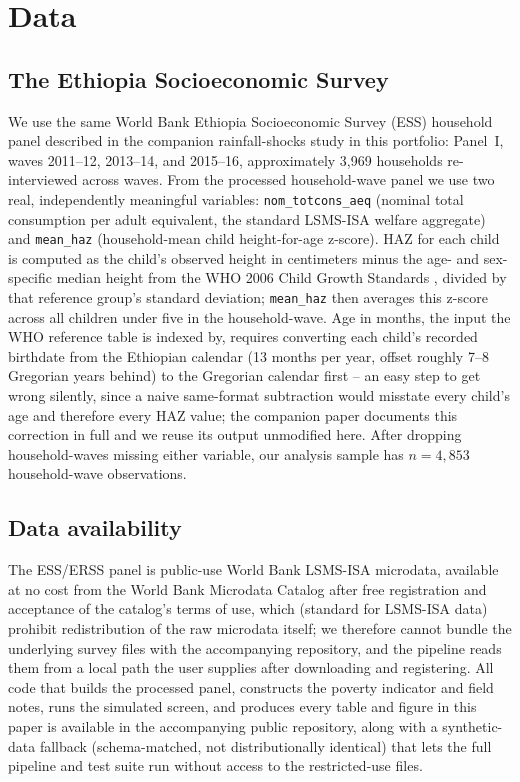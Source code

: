 \documentclass[12pt]{article}
\begin{document}
\section{Data}
\label{sec:data}

\subsection{The Ethiopia Socioeconomic Survey}

We use the same World Bank Ethiopia Socioeconomic Survey (ESS) household panel described in the companion rainfall-shocks study in this portfolio: Panel~I, waves 2011--12, 2013--14, and 2015--16, approximately 3,969 households re-interviewed across waves. From the processed household-wave panel we use two real, independently meaningful variables: \texttt{nom\_totcons\_aeq} (nominal total consumption per adult equivalent, the standard LSMS-ISA welfare aggregate) and \texttt{mean\_haz} (household-mean child height-for-age z-score). HAZ for each child is computed as the child's observed height in centimeters minus the age- and sex-specific median height from the WHO 2006 Child Growth Standards \citep{who2006growth}, divided by that reference group's standard deviation; \texttt{mean\_haz} then averages this z-score across all children under five in the household-wave. Age in months, the input the WHO reference table is indexed by, requires converting each child's recorded birthdate from the Ethiopian calendar (13 months per year, offset roughly 7--8 Gregorian years behind) to the Gregorian calendar first -- an easy step to get wrong silently, since a naive same-format subtraction would misstate every child's age and therefore every HAZ value; the companion paper documents this correction in full and we reuse its output unmodified here. After dropping household-waves missing either variable, our analysis sample has $n=4{,}853$ household-wave observations.

\subsection{Data availability}

The ESS/ERSS panel is public-use World Bank LSMS-ISA microdata, available at no cost from the World Bank Microdata Catalog after free registration and acceptance of the catalog's terms of use, which (standard for LSMS-ISA data) prohibit redistribution of the raw microdata itself; we therefore cannot bundle the underlying survey files with the accompanying repository, and the pipeline reads them from a local path the user supplies after downloading and registering. All code that builds the processed panel, constructs the poverty indicator and field notes, runs the simulated screen, and produces every table and figure in this paper is available in the accompanying public repository, along with a synthetic-data fallback (schema-matched, not distributionally identical) that lets the full pipeline and test suite run without access to the restricted-use files.
\end{document}
